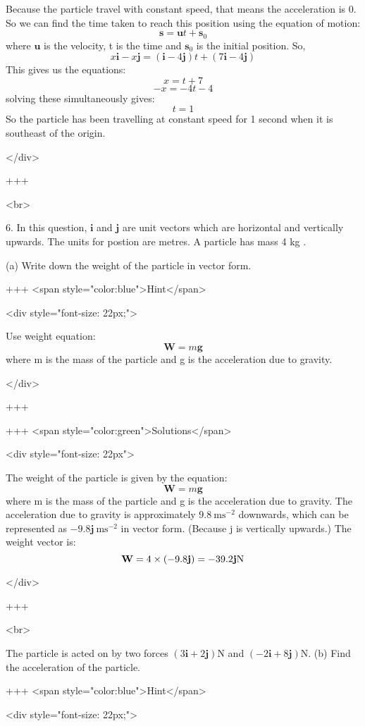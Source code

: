 Because the particle travel with constant speed, that means the acceleration is 0. So we can find the time taken to reach this position using the equation of motion:
$$\mathbf{s}=\mathbf{u} t+\mathbf{s}_{0}$$
where $\mathbf{u}$ is the velocity, t is the time and $\mathbf{s}_{0}$ is the initial position.
So,
\[x \mathbf{i}-x \mathbf{j}=(\mathbf{i}-4 \mathbf{j}) t+(7 \mathbf{i}-4 \mathbf{j})\]
This gives us the equations:
\[x= t+7\]
\[-x=-4 t-4\]
solving these simultaneously gives:
\[t= 1\]
So the particle has been travelling at constant speed for 1 second when it is southeast of the origin.


</div>

+++

<br>

6. In this question, $\mathbf{i}$ and $\mathbf{j}$ are unit vectors which are horizontal and vertically upwards. The units for postion are metres.
A particle has mass 4 kg .

(a) Write down the weight of the particle in vector form.

+++ <span style="color:blue">Hint</span>

<div style="font-size: 22px;">

Use weight equation:
\[\mathbf{W}=m \mathbf{g}\]
where m is the mass of the particle and g is the acceleration due to gravity.

</div>

+++

+++ <span style="color:green">Solutions</span>

<div style="font-size: 22px">

The weight of the particle is given by the equation:
\[\mathbf{W}=m \mathbf{g}\]
where m is the mass of the particle and g is the acceleration due to gravity. The acceleration due to gravity is approximately $9.8 \mathrm{~ms}^{-2}$ downwards, which can be represented as $-9.8 \mathbf{j} \mathrm{~ms}^{-2}$ in vector form. (Because j is vertically upwards.)
The weight vector is:
\[\mathbf{W}=4 \times(-9.8 \mathbf{j})=-39.2 \mathbf{j} \space \mathrm{N}\]

</div>

+++

<br>

The particle is acted on by two forces $(3 \mathbf{i}+2 \mathbf{j}) \mathrm{N}$ and $(-2 \mathbf{i}+8 \mathbf{j}) \mathrm{N}$.
(b) Find the acceleration of the particle.

+++ <span style="color:blue">Hint</span>

<div style="font-size: 22px;">


